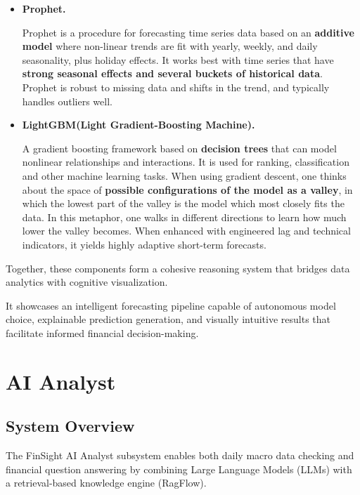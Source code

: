 \begin{itemize}
  \item \textbf{Prophet.}  
  
  Prophet is a procedure for forecasting time series data based on an \textbf{additive model} where non-linear trends are fit with yearly, weekly, and daily seasonality, plus holiday effects. It works best with time series that have \textbf{strong seasonal effects and several buckets of historical data}. Prophet is robust to missing data and shifts in the trend, and typically handles outliers well.

  \item \textbf{LightGBM(Light Gradient-Boosting Machine).}  
  
  A gradient boosting framework based on \textbf{decision trees} that can model nonlinear relationships and interactions. It is used for ranking, classification and other machine learning tasks.
  When using gradient descent, one thinks about the space of \textbf{possible configurations of the model as a valley}, in which the lowest part of the valley is the model which most closely fits the data. In this metaphor, one walks in different directions to learn how much lower the valley becomes.
  When enhanced with engineered lag and technical indicators, it yields highly adaptive short-term forecasts.


\end{itemize}



Together, these components form a cohesive reasoning system that bridges data analytics with cognitive visualization.  

It showcases an intelligent forecasting pipeline capable of autonomous model choice, explainable prediction generation, and visually intuitive results that facilitate informed financial decision-making.

\section{AI Analyst}

\subsection{System Overview}

The FinSight AI Analyst subsystem enables both daily macro data checking and financial question answering by combining Large Language Models (LLMs) with a retrieval-based knowledge engine (RagFlow).


